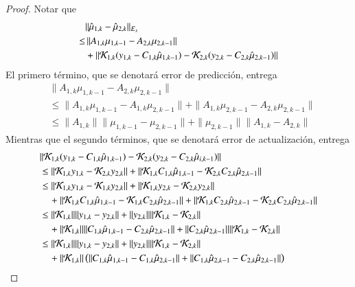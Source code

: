 \begin{proof}
	Notar que
	\begin{equation*}
		\begin{aligned}
			&	\| \hat \mu_{1,k} - \hat \mu_{2,k} \|_{E_x}  \\
			\leq & \, \| A_{1,k} \mu_{1,k-1}  - A_{2,k} \mu_{2,k-1} \|  \\
			& + \|  \mathcal{K}_{1,k} (y_{1,k} - C_{1,k} \hat\mu_{1,k-1}) -  \mathcal{K}_{2,k} (y_{2,k} - C_{2,k} \hat\mu_{2,k-1})  \|
		\end{aligned}
	\end{equation*}
	El primero término, que se denotará error de predicción, entrega
	\begin{equation*}
		\begin{aligned}
			& \| A_{1,k} \mu_{1,k-1}  - A_{2,k} \mu_{2,k-1} \|  \\
			&\leq \| A_{1,k} \mu_{1,k-1}  - A_{1,k} \mu_{2,k-1} \| + \| A_{1,k} \mu_{2,k-1}  - A_{2,k} \mu_{2,k-1} \| \\
			& \leq \| A_{1,k} \| \| \mu_{1,k-1}  - \mu_{2,k-1} \| +  \| \mu_{2,k-1} \| \| A_{1,k} - A_{2,k} \| 
		\end{aligned}
	\end{equation*}
	Mientras que el segundo términos, que se denotará error de actualización, entrega
	\begin{equation*}
		\begin{aligned}
 			& \|  \K_{1,k} (y_{1,k} - C_{1,k} \hat\mu_{1,k-1}) -  \K_{2,k} (y_{2,k} - C_{2,k} \hat\mu_{i,k-1})  \| \\
 			& \leq  \| \K_{1,k} y_{1,k} -  \K_{2,k} y_{2,k}  \| + \| \K_{1,k} C_{1,k} \hat\mu_{1,k-1} - \K_{2,k} C_{2,k} \hat\mu_{2,k-1}  \| \\
 			& \leq \| \K_{1,k} y_{1,k} -  \K_{1,k} y_{2,k}  \| + \| \K_{1,k} y_{2,k} -  \K_{2,k} y_{2,k}  \| \\
 			& \quad + \| \K_{1,k} C_{1,k} \hat\mu_{1,k-1} - \K_{1,k} C_{2,k} \hat\mu_{2,k-1}  \| + \| \K_{1,k} C_{2,k} \hat\mu_{2,k-1} - \K_{2,k} C_{2,k} \hat\mu_{2,k-1}  \| \\
 			& \leq \| \K_{1,k} \| \|  y_{1,k} - y_{2,k}  \| + \| y_{2,k} \| \| \K_{1,k}  -  \K_{2,k}  \| \\
 			& \quad + \| \K_{1,k} \| \|  C_{1,k} \hat\mu_{1,k-1} - C_{2,k} \hat\mu_{2,k-1}  \| + \| C_{2,k} \hat\mu_{2,k-1} \| \| \K_{1,k}  - \K_{2,k} \| \\
 			& \leq \| \K_{1,k} \| \|  y_{1,k} - y_{2,k}  \| + \| y_{2,k} \| \| \K_{1,k}  -  \K_{2,k}  \| \\
 			& \quad + \| \K_{1,k} \| \left ( \|  C_{1,k} \hat\mu_{1,k-1} - C_{1,k} \hat\mu_{2,k-1}  \| + \|  C_{1,k} \hat\mu_{2,k-1} - C_{2,k} \hat\mu_{2,k-1}  \| \right ) \\

\end{aligned}
\end{equation*}
\end{proof}
